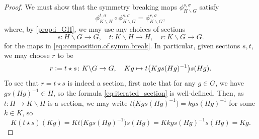 \documentclass{amsart}
\numberwithin{figure}{section}
\numberwithin{equation}{section}
\numberwithin{table}{section}
\theoremstyle{plain}
\theoremstyle{definition}
\theoremstyle{remark}
\theoremstyle{nonumber}
\newcommand{\defeq}{\mathrel{\vcentcolon=}}
\begin{document}
\begin{proof}
We must show that the symmetry breaking maps \(
\phi^{s,\sigma}_{H\backslash G} \) satisfy
\begin{equation}\label{eq:composition.of.symm.break}
  \phi^{t,\sigma}_{K\backslash H}\circ\phi^{s,\sigma}_{H\backslash G}=
  \phi^{r,\sigma}_{K\backslash G},
\end{equation}
where, by \cref{prop:i_GH}, we may use any choices of sections
\[ 
  s\colon H\backslash G\to G,\quad t\colon K\backslash H\to H,\quad r\colon
  K\backslash G\to G.
\]
for the maps in \eqref{eq:composition.of.symm.break}.
In particular, given sections $s,t$, we may choose $r$ to be
\begin{equation}\label{eq:iterated_section}
r\defeq t\star s\colon K\backslash G \to G,\quad Kg \mapsto t\big(Kg
s(Hg)^{-1}\big)s(Hg).
\end{equation}
To see that $r=t\star s$ is indeed a section, first note that for any $g\in G$, we have $gs(Hg)^{-1}\in H$, so the formula
\eqref{eq:iterated_section} is well-defined. Then, as
$t\colon H\to K\backslash H$ is a section, we may write $t\big(Kg s(Hg)^{-1}\big)=k g s(Hg)^{-1}$ for some $k\in K$, so
\[
K(t\star s)(Kg)= Kt\big(Kg s(Hg)^{-1}\big)s(Hg)=Kk g s(Hg)^{-1} s(Hg)=Kg.
\]


\end{proof}
\end{document}
